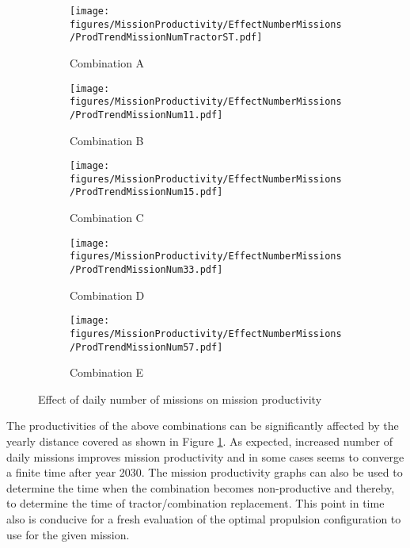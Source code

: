 \documentclass[ExampleMasters.tex]{subfiles}
\begin{document}
	\begin{figure}
		\begin{subfigure}{.5\textwidth}
			\centering
			\texttt{[image: figures/MissionProductivity/EffectNumberMissions/ProdTrendMissionNumTractorST.pdf]}
			\caption{Combination A}
		\end{subfigure}
		\begin{subfigure}{.5\textwidth}
			\centering
			\texttt{[image: figures/MissionProductivity/EffectNumberMissions/ProdTrendMissionNum11.pdf]}
			\caption{Combination B}
		\end{subfigure}
		\begin{subfigure}{.5\textwidth}
			\centering
			\texttt{[image: figures/MissionProductivity/EffectNumberMissions/ProdTrendMissionNum15.pdf]}
			\caption{Combination C}
		\end{subfigure}
		\begin{subfigure}{.5\textwidth}
			\centering
			\texttt{[image: figures/MissionProductivity/EffectNumberMissions/ProdTrendMissionNum33.pdf]}
			\caption{Combination D}
		\end{subfigure}
		\begin{subfigure}{.5\textwidth}
			\centering
			\texttt{[image: figures/MissionProductivity/EffectNumberMissions/ProdTrendMissionNum57.pdf]}
			\caption{Combination E}
		\end{subfigure}
		\caption{Effect of daily number of missions on mission productivity}
		\label{ProdNumMissions}
	\end{figure} 

	
	The productivities of the above combinations can be significantly affected by the yearly distance covered as shown in Figure \ref{ProdNumMissions}. As expected, increased number of daily missions improves mission productivity and in some cases seems to converge a finite time after year 2030. The mission productivity graphs can also be used to determine the time when the combination becomes non-productive and thereby, to determine the time of tractor/combination replacement. This point in time also is conducive for a fresh evaluation of the optimal propulsion configuration to use for the given mission.\\

	\newpage
\end{document}
